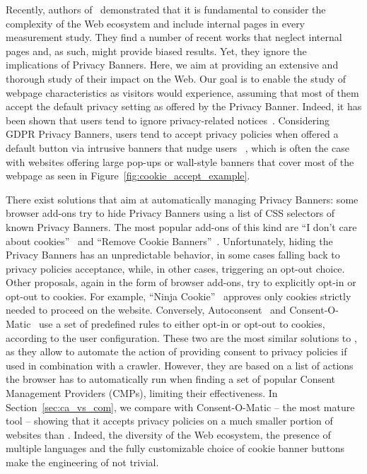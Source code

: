 Recently, authors of~\cite{aqeel2020on} demonstrated that it is fundamental to consider the complexity of the Web ecosystem and include internal pages in every measurement study. They find a number of recent works that neglect internal pages and, as such, might provide biased results. Yet, they ignore the implications of Privacy Banners. Here, we aim at providing an extensive and thorough study of their impact on the Web. Our goal is to enable the study of webpage characteristics as visitors would experience, assuming that most of them accept the default privacy setting as offered by the Privacy Banner. Indeed, it has been shown that users tend to ignore privacy-related notices~\cite{vila2003we, grossklags2007empirical, coventry2016personality}. Considering GDPR Privacy Banners, users tend to accept privacy policies when offered a default button via intrusive banners that nudge users ~\cite{CookieBenchmarkStudy,bauer2021you}, which is often the case~\cite{hausner2021dark} with websites offering large pop-ups or wall-style banners that cover most of the webpage as seen in Figure~\ref{fig:cookie_accept_example}.

There exist solutions that aim at automatically managing Privacy Banners: some browser add-ons try to hide Privacy Banners using a list of CSS selectors of known Privacy Banners. The most popular add-ons of this kind are ``I don't care about cookies''~\cite{idontcare} and ``Remove Cookie Banners''~\cite{remove}. Unfortunately, hiding the Privacy Banners has an unpredictable behavior, in some cases falling back to privacy policies acceptance, while, in other cases, triggering an opt-out choice. Other proposals, again in the form of browser add-ons, try to explicitly opt-in or opt-out to cookies. For example, ``Ninja Cookie''~\cite{ninja} approves only cookies strictly needed to proceed on the website. Conversely, Autoconsent~\cite{autoconsent} and Consent-O-Matic~\cite{consentomatic} use a set of predefined rules to either opt-in or opt-out to cookies, according to the user configuration. These two are the most similar solutions to \TOOL, as they allow to automate the action of providing consent to privacy policies if used in combination with a crawler. However, they are based on a list of actions the browser has to automatically run when finding a set of popular Consent Management Providers (CMPs), limiting their effectiveness. In Section~\ref{sec:ca_vs_com}, we compare \TOOL with Consent-O-Matic -- the most mature tool -- showing that it accepts privacy policies on a much smaller portion of websites than \TOOL. Indeed, the diversity of the Web ecosystem, the presence of multiple languages and the fully customizable choice of cookie banner buttons make the engineering of \TOOL not trivial.

